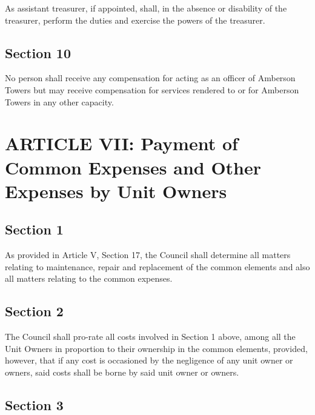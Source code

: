 \documentclass[
  14pt,
]{book}
\begin{document}
As assistant treasurer, if appointed, shall, in the absence or disability of the treasurer, perform the duties and exercise the powers of the treasurer.

\hypertarget{section-10-2}{%
\subsection*{Section 10}\label{section-10-2}}

No person shall receive any compensation for acting as an officer of Amberson Towers but may receive compensation for services rendered to or for Amberson Towers in any other capacity.

\hypertarget{article-vii-payment-of-common-expenses-and-other-expenses-by-unit-owners}{%
\section*{ARTICLE VII: Payment of Common Expenses and Other Expenses by Unit Owners}\label{article-vii-payment-of-common-expenses-and-other-expenses-by-unit-owners}}

\hypertarget{section-1-6}{%
\subsection*{Section 1}\label{section-1-6}}

As provided in Article V, Section 17, the Council shall determine all matters relating to maintenance, repair and replacement of the common elements and also all matters relating to the common expenses.

\hypertarget{section-2-6}{%
\subsection*{Section 2}\label{section-2-6}}

The Council shall pro-rate all costs involved in Section 1 above, among all the Unit Owners in proportion to their ownership in the common elements, provided, however, that if any cost is occasioned by the negligence of any unit owner or owners, said costs shall be borne by said unit owner or owners.

\hypertarget{section-3-3}{%
\subsection*{Section 3}\label{section-3-3}}
\end{document}
